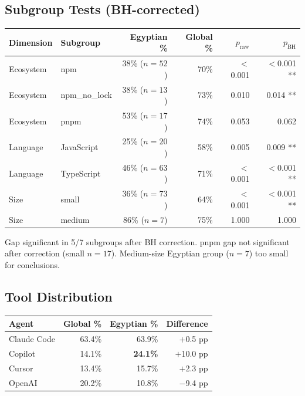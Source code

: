 \documentclass[12pt,a4paper]{article}
\begin{document}
\subsection{Subgroup Tests (BH-corrected)}

\begin{table}[h]
\centering
\begin{tabular}{@{}llrrrr@{}}
\toprule
Dimension & Subgroup & Egyptian \% & Global \% & $p_{\text{raw}}$ & $p_{\text{BH}}$ \\
\midrule
Ecosystem & npm           & 38\% ($n=52$) & 70\% & $<$0.001 & $<$0.001 ** \\
Ecosystem & npm\_no\_lock & 38\% ($n=13$) & 73\% & 0.010    & 0.014 ** \\
Ecosystem & pnpm          & 53\% ($n=17$) & 74\% & 0.053    & 0.062 \\
Language  & JavaScript    & 25\% ($n=20$) & 58\% & 0.005    & 0.009 ** \\
Language  & TypeScript    & 46\% ($n=63$) & 71\% & $<$0.001 & $<$0.001 ** \\
Size      & small         & 36\% ($n=73$) & 64\% & $<$0.001 & $<$0.001 ** \\
Size      & medium        & 86\% ($n=7$)  & 75\% & 1.000    & 1.000 \\
\bottomrule
\end{tabular}
\end{table}

Gap significant in 5/7 subgroups after BH correction. pnpm gap not significant after correction (small $n=17$). Medium-size Egyptian group ($n=7$) too small for conclusions.

\subsection{Tool Distribution}

\begin{table}[h]
\centering
\begin{tabular}{@{}lrrr@{}}
\toprule
Agent & Global \% & Egyptian \% & Difference \\
\midrule
Claude Code & 63.4\% & 63.9\% & $+$0.5 pp \\
Copilot     & 14.1\% & \textbf{24.1\%} & $+$10.0 pp \\
Cursor      & 13.4\% & 15.7\% & $+$2.3 pp \\
OpenAI      & 20.2\% & 10.8\% & $-$9.4 pp \\
\bottomrule
\end{tabular}
\end{table}
\end{document}
